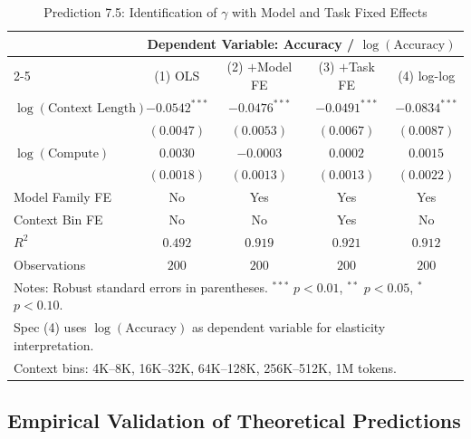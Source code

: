 \begin{table}[htbp]
\centering
\caption{Prediction 7.5: Identification of $\gamma$ with Model and Task Fixed Effects}
\label{tab:prediction7_5}
\begin{tabular}{lcccc}
\toprule
& \multicolumn{4}{c}{Dependent Variable: Accuracy / $\log(\text{Accuracy})$} \\
\cmidrule(lr){2-5}
& (1) OLS & (2) $+$Model FE & (3) $+$Task FE & (4) log-log \\
\midrule
$\log(\text{Context Length})$ & $-0.0542^{***}$ & $-0.0476^{***}$ & $-0.0491^{***}$ & $-0.0834^{***}$ \\
                    & $(0.0047)$ & $(0.0053)$ & $(0.0067)$ & $(0.0087)$ \\
$\log(\text{Compute})$ & $0.0030$ & $-0.0003$ & $0.0002$ & $0.0015$ \\
                    & $(0.0018)$ & $(0.0013)$ & $(0.0013)$ & $(0.0022)$ \\
\midrule
Model Family FE     & No & Yes & Yes & Yes \\
Context Bin FE      & No & No & Yes & No \\
\midrule
$R^2$               & $0.492$ & $0.919$ & $0.921$ & $0.912$ \\
Observations        & $200$ & $200$ & $200$ & $200$ \\
\bottomrule
\multicolumn{5}{l}{\footnotesize{Notes: Robust standard errors in parentheses. $^{***}$ $p{<}0.01$, $^{**}$ $p{<}0.05$, $^{*}$ $p{<}0.10$.}} \\
\multicolumn{5}{l}{\footnotesize{Spec (4) uses $\log(\text{Accuracy})$ as dependent variable for elasticity interpretation.}} \\
\multicolumn{5}{l}{\footnotesize{Context bins: 4K--8K, 16K--32K, 64K--128K, 256K--512K, 1M tokens.}} \\
\end{tabular}
\end{table}


\subsection{Empirical Validation of Theoretical Predictions}

